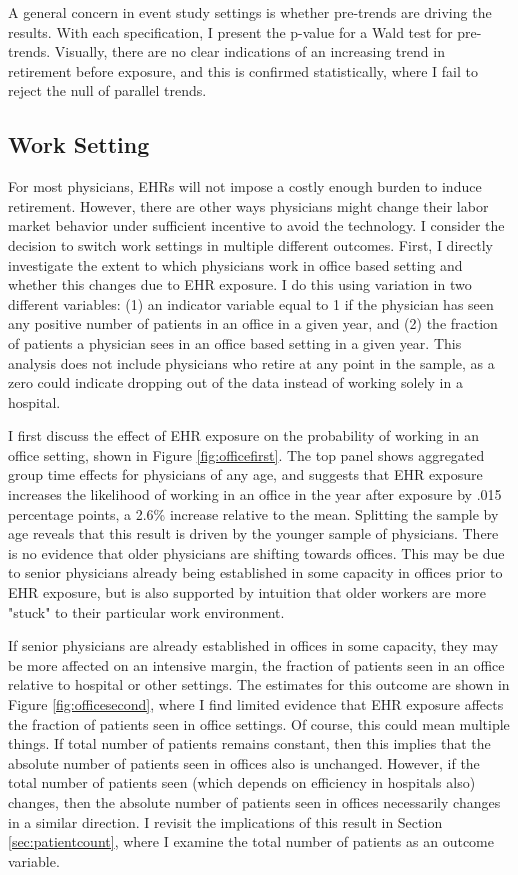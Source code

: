 \documentclass[11pt]{article}
\begin{document}
A general concern in event study settings is whether pre-trends are driving the results. With each specification, I present the p-value for a Wald test for pre-trends. Visually, there are no clear indications of an increasing trend in retirement before exposure, and this is confirmed statistically, where I fail to reject the null of parallel trends.


\subsection{Work Setting}

For most physicians, EHRs will not impose a costly enough burden to induce retirement. However, there are other ways physicians might change their labor market behavior under sufficient incentive to avoid the technology. I consider the decision to switch work settings in multiple different outcomes. First, I directly investigate the extent to which physicians work in office based setting and whether this changes due to EHR exposure. I do this using variation in two different variables: (1) an indicator variable equal to 1 if the physician has seen any positive number of patients in an office in a given year, and (2) the fraction of patients a physician sees in an office based setting in a given year. This analysis does not include physicians who retire at any point in the sample, as a zero could indicate dropping out of the data instead of working solely in a hospital. 

I first discuss the effect of EHR exposure on the probability of working in an office setting, shown in Figure \ref{fig:officefirst}. The top panel shows aggregated group time effects for physicians of any age, and suggests that EHR exposure increases the likelihood of working in an office in the year after exposure by .015 percentage points, a 2.6\% increase relative to the mean. Splitting the sample by age reveals that this result is driven by the younger sample of physicians. There is no evidence that older physicians are shifting towards offices. This may be due to senior physicians already being established in some capacity in offices prior to EHR exposure, but is also supported by intuition that older workers are more "stuck" to their particular work environment. 

If senior physicians are already established in offices in some capacity, they may be more affected on an intensive margin, the fraction of patients seen in an office relative to hospital or other settings. The estimates for this outcome are shown in Figure \ref{fig:officesecond}, where I find limited evidence that EHR exposure affects the fraction of patients seen in office settings. Of course, this could mean multiple things. If total number of patients remains constant, then this implies that the absolute number of patients seen in offices also is unchanged. However, if the total number of patients seen (which depends on efficiency in hospitals also) changes, then the absolute number of patients seen in offices necessarily changes in a similar direction. I revisit the implications of this result in Section \ref{sec:patientcount}, where I examine the total number of patients as an outcome variable.
\end{document}
